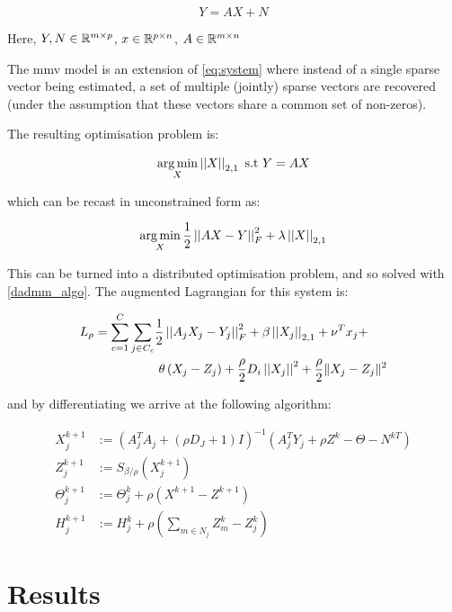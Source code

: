 \begin{equation}
Y = AX + N
\end{equation}

Here, \(Y, N\in {\mathbb{R}}^{m\times p}\), \(x \in {\mathbb{R}}^{p\times n}\), \(A\in {\mathbb{R}}^{m \times n}\)

The \gls{mmv} model is an extension of \eqref{eq:system} where instead of a single sparse vector being estimated, a set of multiple (jointly) sparse vectors are recovered (under the assumption that these vectors share a common set of non-zeros).

The resulting optimisation problem is:

\begin{equation}
\operatorname*{arg\,min}_X \left|\left|X\right|\right|_{2,1} \text{ s.t } Y=AX
\label{program:bpmmv}
\end{equation}

which can be recast in unconstrained form as:

\begin{equation}
\operatorname*{arg\,min}_X \frac{1}{2}\left|\left|AX-Y\right|\right|_F^2 + \lambda\left|\left|X\right|\right|_{2,1}
\label{program:lassommv}
\end{equation}

This can be turned into a distributed optimisation problem, and so solved with \eqref{dadmm_algo}. The augmented Lagrangian for this system is:

\begin{align}
L_\rho = \sum_{c=1}^C\sum_{j \in C_c} & \frac{1}{2} \left|\left|A_j X_j - Y_j\right|\right|_F^2  + \beta\left|\left|X_j\right|\right|_{2,1}  + \nu^Tx_j  + \\
& \text{        } \theta\left(X_j - Z_j\right) + \frac{\rho}{2}D_i\left|\left|X_j\right|\right|^2 + \frac{\rho}{2}\|X_j-Z_j\|^2
\end{align}

and by differentiating we arrive at the following algorithm:

\begin{align}
X_j^{k+1} &:= \left( A_j^T A_j + (\rho D_J + 1) I \right)^{-1}\left(A_j^T Y_j + \rho Z^k - \Theta - N^{kT} \right) \\
Z_j^{k+1} &:= S_{\beta/\rho}\left(X_j^{k+1} \right)
 \\
\Theta_j^{k+1} &:= \Theta_j^{k} + \rho \left(X^{k+1}-Z^{k+1}\right) \\
H_j^{k+1} &:= H_j^k + \rho \left(\sum_{m \in N_j} Z_m^k - Z_j^k\right)
\end{align}

\section{Results} \label{sec:results}

